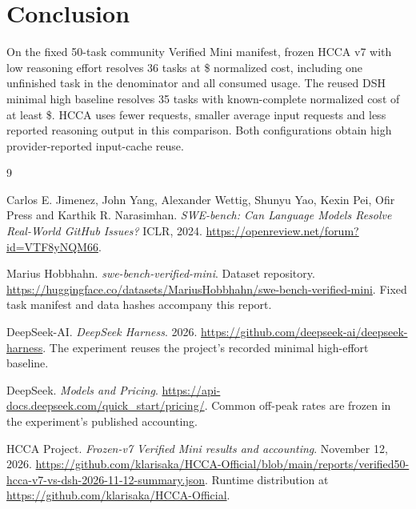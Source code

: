 \documentclass[10pt,a4paper]{article}
\begin{document}
\section{Conclusion}

On the fixed 50-task community Verified Mini manifest, frozen HCCA v7 with low
reasoning effort resolves 36 tasks at \$\HCost{} normalized cost, including one
unfinished task in the
denominator and all consumed usage. The reused DSH minimal high baseline
resolves 35 tasks with known-complete normalized cost of at least
\$\BCost{}. HCCA uses fewer requests, smaller average input requests and less
reported reasoning output in this comparison. Both configurations obtain high
provider-reported input-cache reuse.

\begin{thebibliography}{9}
\small
\raggedright
{}
Carlos E. Jimenez, John Yang, Alexander Wettig, Shunyu Yao, Kexin Pei,
Ofir Press and Karthik R. Narasimhan.
\emph{SWE-bench\textup{:} Can Language Models Resolve Real-World GitHub Issues?}
ICLR, 2024. \url{https://openreview.net/forum?id=VTF8yNQM66}.

Marius Hobbhahn. \emph{swe-bench-verified-mini}. Dataset repository.
\url{https://huggingface.co/datasets/MariusHobbhahn/swe-bench-verified-mini}.
Fixed task manifest and data hashes accompany this report.

DeepSeek-AI. \emph{DeepSeek Harness}. 2026.
\url{https://github.com/deepseek-ai/deepseek-harness}.
The experiment reuses the project's recorded minimal high-effort baseline.

DeepSeek. \emph{Models and Pricing}.
\url{https://api-docs.deepseek.com/quick_start/pricing/}.
Common off-peak rates are frozen in the experiment's published accounting.

HCCA Project. \emph{Frozen-v7 Verified Mini results and accounting}.
November 12, 2026.
\url{https://github.com/klarisaka/HCCA-Official/blob/main/reports/verified50-hcca-v7-vs-dsh-2026-11-12-summary.json}.
Runtime distribution at \url{https://github.com/klarisaka/HCCA-Official}.
\end{thebibliography}
\end{document}
